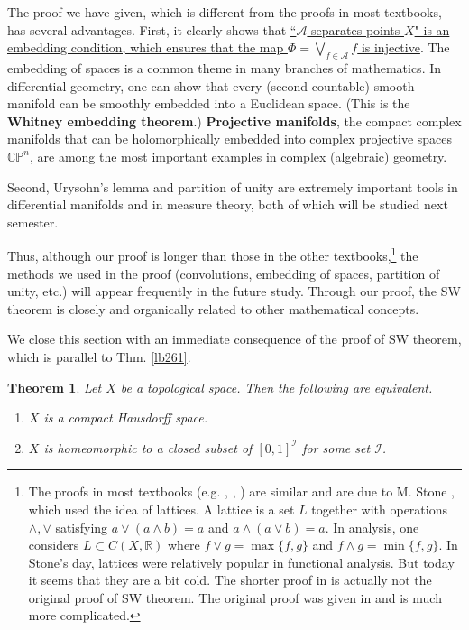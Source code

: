 \documentclass[12pt,b5paper,notitlepage]{article}
\theoremstyle{definition}
\theoremstyle{plain}
\newtheorem{thm}[df]{Theorem}
\newcommand{\scr}{\mathscr}
\newcommand{\Cbb}{\mathbb C}
\newcommand{\Pbb}{\mathbb P}
\newcommand{\Rbb}{\mathbb R}
\numberwithin{equation}{section}
\begin{document}
The proof we have given, which is different from the proofs in most textbooks, has several advantages. First, it clearly shows that \uline{``$\scr A$ separates points $X$" is an embedding condition, which ensures that the map $\Phi=\bigvee_{f\in\scr A}f$ is injective}. The embedding of spaces is a common theme in many branches of mathematics. In differential geometry, one can show that every (second countable) smooth manifold can be smoothly embedded into a Euclidean space. (This is the \textbf{Whitney embedding theorem}.) \textbf{Projective manifolds}, the
compact complex manifolds that can be holomorphically embedded into complex projective spaces $\Cbb\Pbb^n$, are among the most important examples in complex (algebraic) geometry.

Second, Urysohn's lemma and partition of unity are extremely important tools in differential manifolds and in measure theory, both of which will be studied next semester.  

Thus, although our proof is longer than those in the other textbooks,\footnote{The proofs in most textbooks (e.g. \cite[Sec. 4.7]{Fol}, \cite[Ch. 7]{Rud-P}, \cite[Sec. 16.4]{Zor-2}) are similar and are due to M. Stone \cite{Sto48}, which used the idea of lattices. A lattice is a set $L$ together with operations $\wedge,\vee$ satisfying $a \vee(a \wedge b)=a$ and $a \wedge(a \vee b)=a$. In analysis, one considers $L\subset C(X,\Rbb)$ where $f\vee g=\max\{f,g\}$ and $f\wedge g=\min\{f,g\}$. In Stone's day, lattices were relatively popular in functional analysis. But today it seems that they are a bit cold. The shorter proof in \cite{Sto48} is actually not the original proof of SW theorem. The original proof was given in \cite{Sto37} and is much more complicated.} the methods we used in the proof (convolutions, embedding of spaces, partition of unity, etc.) will appear frequently in the future study. Through our proof, the SW theorem is closely and organically related to other mathematical concepts.  



We close this section with an immediate consequence of the proof of SW theorem, which is parallel to Thm. \ref{lb261}.

\begin{thm}
Let $X$ be a topological space. Then the following are equivalent.
\begin{enumerate}[label=(\arabic*)]
\item $X$ is a compact Hausdorff space.
\item $X$ is homeomorphic to a closed subset of $[0,1]^{\scr I}$ for some set $\scr I$.
\end{enumerate}
\end{thm}
\end{document}
